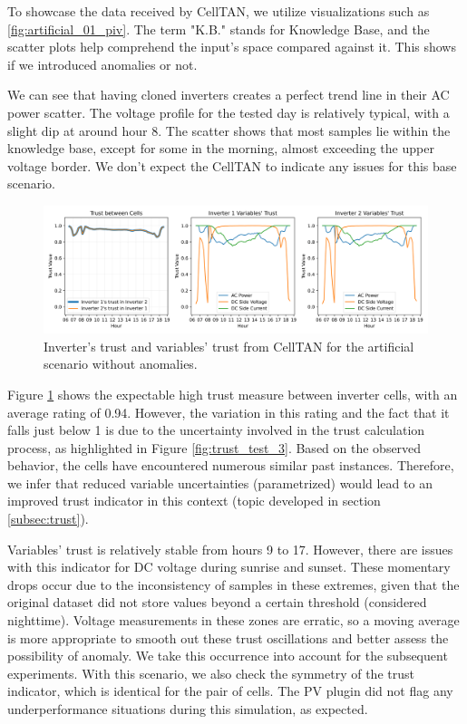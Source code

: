 To showcase the data received by CellTAN, we utilize visualizations such as \ref{fig:artificial_01_piv}. The term "K.B." stands for Knowledge Base, and the scatter plots help comprehend the input's space compared against it. This shows if we introduced anomalies or not.

We can see that having cloned inverters creates a perfect trend line in their AC power scatter. The voltage profile for the tested day is relatively typical, with a slight dip at around hour 8. The scatter shows that most samples lie within the knowledge base, except for some in the morning, almost exceeding the upper voltage border.
We don't expect the CellTAN to indicate any issues for this base scenario.

\begin{figure}[h!]
    \centering
    \includegraphics[width=\linewidth]{figures/chapter5/results/artificial/42_results_test_clone_01-1.png}
    \caption{Inverter's trust and variables' trust from CellTAN for the artificial scenario without anomalies.}
    \label{fig:artificial_results_01}
\end{figure}

Figure \ref{fig:artificial_results_01} shows the expectable high trust measure between inverter cells, with an average rating of 0.94. However, the variation in this rating and the fact that it falls just below 1 is due to the uncertainty involved in the trust calculation process, as highlighted in Figure \ref{fig:trust_test_3}. Based on the observed behavior, the cells have encountered numerous similar past instances. Therefore, we infer that reduced variable uncertainties (parametrized) would lead to an improved trust indicator in this context (topic developed in section \ref{subsec:trust}).


Variables' trust is relatively stable from hours 9 to 17. However, there are issues with this indicator for DC voltage during sunrise and sunset. These momentary drops occur due to the inconsistency of samples in these extremes, given that the original dataset did not store values beyond a certain threshold (considered nighttime). Voltage measurements in these zones are erratic, so a moving average is more appropriate to smooth out these trust oscillations and better assess the possibility of anomaly. We take this occurrence into account for the subsequent experiments.
With this scenario, we also check the symmetry of the trust indicator, which is identical for the pair of cells. The PV plugin did not flag any underperformance situations during this simulation, as expected.


